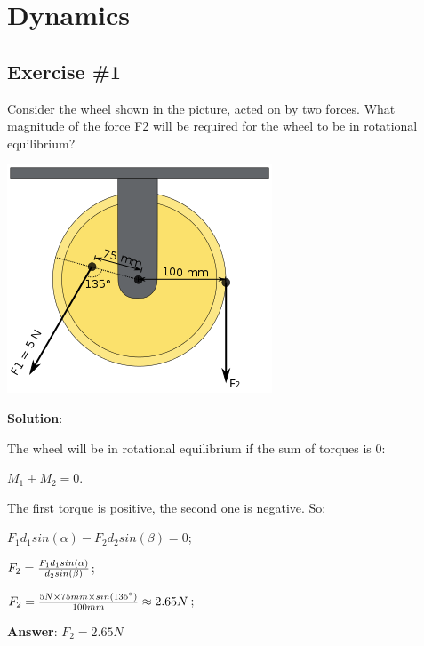 \documentclass[a4paper,12pt]{article}
\begin{document}
    \section*{Dynamics}
        \subsection*{Exercise \#1}
            Consider the wheel shown in the picture, acted on by two forces. What
            magnitude of the force F2 will be required for the wheel to be in rotational
            equilibrium?

            \includegraphics{img/torque-angular-momentum-ex1.png}

            \textbf{Solution}:
                
            The wheel will be in rotational equilibrium if the sum of torques is 0:

            \begin{center}$M_1 + M_2 = 0$.\end{center}

            The first torque is positive, the second one is negative. So:

            \begin{center}
                $F_1 d_1 sin(\alpha) - F_2 d_2 sin(\beta) = 0$;
                
                $F_2 = {F_1 d_1 sin(\alpha) \over d_2 sin(\beta)}$;

                $F_2 = {5N \times 75mm \times sin(135 \degree) \over 100mm} \approx 2.65N$;
            \end{center}

            \textbf{Answer}: $F_2 = 2.65N$
\end{document}

